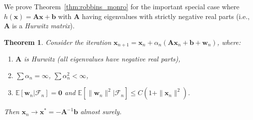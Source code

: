 \documentclass[11pt,a4paper]{article}
\theoremstyle{definition}
\theoremstyle{plain}
\newtheorem{theorem}{Theorem}[section]
\theoremstyle{remark}
\newcommand{\E}{\mathbb{E}}
\begin{document}
We prove Theorem~\ref{thm:robbins_monro} for the important special case where $h(\bm{x}) = \bm{A}\bm{x} + \bm{b}$ with $\bm{A}$ having eigenvalues with strictly negative real parts (i.e., $\bm{A}$ is a \emph{Hurwitz matrix}).

\begin{theorem}
\label{thm:rm_linear}
Consider the iteration $\bm{x}_{n+1} = \bm{x}_n + \alpha_n(\bm{A}\bm{x}_n + \bm{b} + \bm{w}_n)$, where:
\begin{enumerate}[nosep]
    \item $\bm{A}$ is Hurwitz (all eigenvalues have negative real parts),
    \item $\sum \alpha_n = \infty$, $\sum \alpha_n^2 < \infty$,
    \item $\E[\bm{w}_n | \mathcal{F}_n] = \bm{0}$ and $\E[\|\bm{w}_n\|^2 | \mathcal{F}_n] \leq C(1 + \|\bm{x}_n\|^2)$.
\end{enumerate}
Then $\bm{x}_n \to \bm{x}^* = -\bm{A}^{-1}\bm{b}$ almost surely.
\end{theorem}
\end{document}
